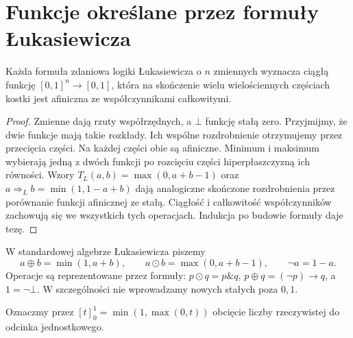 \section{Funkcje określane przez formuły Łukasiewicza}
\begin{stwierdzenie}\label{prop:lst-fuzzy-mcnaughton-forward}
Każda formuła zdaniowa logiki Łukasiewicza o $n$ zmiennych wyznacza
ciągłą funkcję $[0,1]^n\to[0,1]$, która na skończenie wielu
wielościennych częściach kostki jest afiniczna ze współczynnikami
całkowitymi.
\end{stwierdzenie}
\begin{proof}
Zmienne dają rzuty współrzędnych, a $\bot$ funkcję stałą zero.
Przyjmijmy, że dwie funkcje mają takie rozkłady. Ich wspólne
rozdrobnienie otrzymujemy przez przecięcia części. Na każdej części
obie są afiniczne. Minimum i maksimum wybierają jedną z dwóch
funkcji po rozcięciu części hiperpłaszczyzną ich równości.
Wzory $T_L(a,b)=\max(0,a+b-1)$ oraz
$a\Rightarrow_L b=\min(1,1-a+b)$ dają analogiczne skończone
rozdrobnienia przez porównanie funkcji afinicznej ze stałą.
Ciągłość i całkowitość współczynników zachowują się we wszystkich
tych operacjach. Indukcja po budowie formuły daje tezę.
\end{proof}
\begin{definicja}\label{def:lst-fuzzy-mv-operations}
W standardowej algebrze Łukasiewicza piszemy
\[
 a\oplus b=\min(1,a+b),\qquad a\odot b=\max(0,a+b-1),
 \qquad \neg a=1-a.
\]
Operacje są reprezentowane przez formuły: $p\odot q=p\mathbin{\&}q$,
$p\oplus q=(\neg p)\to q$, a $1=\neg\bot$. W szczególności nie
wprowadzamy nowych stałych poza $0,1$.
\end{definicja}
Oznaczmy przez $[t]_0^1=\min(1,\max(0,t))$ obcięcie liczby
rzeczywistej do odcinka jednostkowego.

